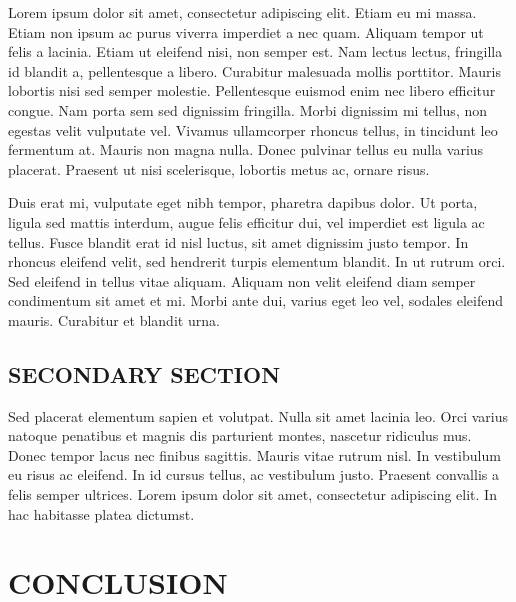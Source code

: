 \documentclass[
  12pt,
  a4paper,
  oneside]{tesesusp}
\begin{document}
Lorem ipsum dolor sit amet, consectetur adipiscing elit. Etiam eu mi
massa. Etiam non ipsum ac purus viverra imperdiet a nec quam. Aliquam
tempor ut felis a lacinia. Etiam ut eleifend nisi, non semper est. Nam
lectus lectus, fringilla id blandit a, pellentesque a libero. Curabitur
malesuada mollis porttitor. Mauris lobortis nisi sed semper molestie.
Pellentesque euismod enim nec libero efficitur congue. Nam porta sem sed
dignissim fringilla. Morbi dignissim mi tellus, non egestas velit
vulputate vel. Vivamus ullamcorper rhoncus tellus, in tincidunt leo
fermentum at. Mauris non magna nulla. Donec pulvinar tellus eu nulla
varius placerat. Praesent ut nisi scelerisque, lobortis metus ac, ornare
risus.

Duis erat mi, vulputate eget nibh tempor, pharetra dapibus dolor. Ut
porta, ligula sed mattis interdum, augue felis efficitur dui, vel
imperdiet est ligula ac tellus. Fusce blandit erat id nisl luctus, sit
amet dignissim justo tempor. In rhoncus eleifend velit, sed hendrerit
turpis elementum blandit. In ut rutrum orci. Sed eleifend in tellus
vitae aliquam. Aliquam non velit eleifend diam semper condimentum sit
amet et mi. Morbi ante dui, varius eget leo vel, sodales eleifend
mauris. Curabitur et blandit urna.

\hypertarget{secondary-section-1}{%
\section{SECONDARY SECTION}\label{secondary-section-1}}

Sed placerat elementum sapien et volutpat. Nulla sit amet lacinia leo.
Orci varius natoque penatibus et magnis dis parturient montes, nascetur
ridiculus mus. Donec tempor lacus nec finibus sagittis. Mauris vitae
rutrum nisl. In vestibulum eu risus ac eleifend. In id cursus tellus, ac
vestibulum justo. Praesent convallis a felis semper ultrices. Lorem
ipsum dolor sit amet, consectetur adipiscing elit. In hac habitasse
platea dictumst.


\hypertarget{conclusion}{%
\chapter{CONCLUSION}\label{conclusion}}
\end{document}
